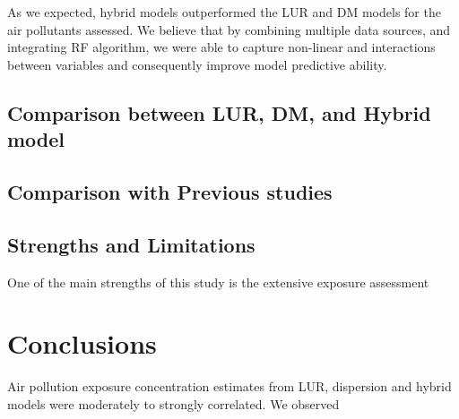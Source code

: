 \documentclass{article}
\begin{document}
As we expected, hybrid models outperformed the LUR and DM models for the air pollutants assessed. We believe that by combining multiple data sources, and integrating RF algorithm, we were able to capture non-linear and interactions between variables and consequently improve model predictive ability. 

\subsection{Comparison between LUR, DM, and Hybrid model}






\subsection{Comparison with Previous studies}




\subsection{Strengths and Limitations}
One of the main strengths of this study is the extensive exposure assessment 

\section{Conclusions}

Air pollution exposure concentration estimates from LUR, dispersion and hybrid models were moderately to strongly correlated. We observed 



































\newpage


\end{document}
